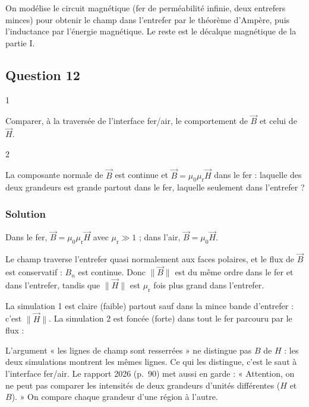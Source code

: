 \documentclass[11pt,a4paper]{article}
\newcommand{\equationajustee}[1]{%
  \sbox{\boiteequation}{$\displaystyle #1$}%
  \ifdim\wd\boiteequation>\linewidth
    \[\resizebox{\linewidth}{!}{\usebox{\boiteequation}}\]%
  \else
    \[#1\]%
  \fi}
\begin{document}
On modélise le circuit magnétique (fer de perméabilité infinie, deux entrefers minces) pour obtenir le champ dans l'entrefer par le théorème d'Ampère, puis l'inductance par l'énergie magnétique. Le reste est le décalque magnétique de la partie I.

\hypertarget{question-12}{%
\subsection{Question 12}\label{question-12}}

\begin{indication}{1}

Comparer, à la traversée de l'interface fer/air, le comportement de \(\vec B\) et celui de \(\vec H\).

\end{indication}

\begin{indication}{2}

La composante normale de \(\vec B\) est continue et \(\vec B=\mu_0\mu_{\mathrm r}\vec H\) dans le fer : laquelle des deux grandeurs est grande partout dans le fer, laquelle seulement dans l'entrefer ?

\end{indication}

\hypertarget{solution-11}{%
\subsubsection{Solution}\label{solution-11}}

Dans le fer, \(\vec B=\mu_0\mu_{\mathrm r}\vec H\) avec \(\mu_{\mathrm r}\gg1\) ; dans l'air, \(\vec B=\mu_0\vec H\).

Le champ traverse l'entrefer quasi normalement aux faces polaires, et le flux de \(\vec B\) est conservatif : \(B_n\) est continue. Donc \(\|\vec B\|\) est du même ordre dans le fer et dans l'entrefer, tandis que \(\|\vec H\|\) est \(\mu_{\mathrm r}\) fois plus grand dans l'entrefer.

La simulation 1 est claire (faible) partout sauf dans la mince bande d'entrefer : c'est \(\|\vec H\|\). La simulation 2 est foncée (forte) dans tout le fer parcouru par le flux :
\equationajustee{\boxed{\|\vec B\|\ \text{: simulation 2}}}

\begin{piege}

L'argument « les lignes de champ sont resserrées » ne distingue pas \(B\) de \(H\) : les deux simulations montrent les mêmes lignes. Ce qui les distingue, c'est le saut à l'interface fer/air. Le rapport 2026 (p.~90) met aussi en garde : « Attention, on ne peut pas comparer les intensités de deux grandeurs d'unités différentes (\(H\) et \(B\)). » On compare chaque grandeur d'une région à l'autre.

\end{piege}
\end{document}
